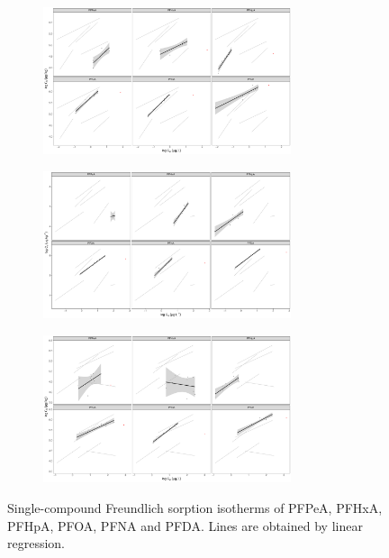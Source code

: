 \begin{figure}
    \centering
        \begin{subfigure}[t]{\linewidth}
            \centering
            \includegraphics[width=0.8\textwidth]{R/figs/ULS_facet_isotherm.pdf}
            \label{fig:ULS_isotherm}
        \end{subfigure}
        \begin{subfigure}[]{\linewidth}
            \centering
            \includegraphics[width=0.8\textwidth]{R/figs/DSL_facet_isotherm.pdf}
            \label{fig:DSL_isotherm}
        \end{subfigure}   
\end{figure}
\begin{figure}[t]\ContinuedFloat
        \begin{subfigure}[]{\linewidth}
            \centering
            \includegraphics[width=0.8\textwidth]{R/figs/CWC_facet_isotherm.pdf}
            \label{fig:CWC_isotherm}
        \end{subfigure}
        \caption{Single-compound Freundlich sorption isotherms of PFPeA, PFHxA, PFHpA, PFOA, PFNA and PFDA. Lines are obtained by linear regression.}
        \label{fig:sorption_isotherms_all}
\end{figure}

